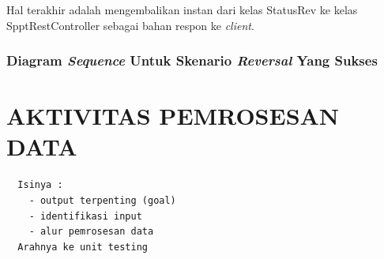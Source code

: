 \documentclass[pdftex,12pt, oneside]{article}
\begin{document}
Hal terakhir adalah mengembalikan instan dari kelas StatusRev ke kelas SpptRestController sebagai bahan respon ke \textit{client}.

\subsubsection{Diagram \textit{Sequence} Untuk Skenario \textit{Reversal} Yang Sukses}


\section{AKTIVITAS PEMROSESAN DATA}

\begin{verbatim}
  Isinya :
    - output terpenting (goal)
    - identifikasi input 
    - alur pemrosesan data
  Arahnya ke unit testing
\end{verbatim}
\end{document}
